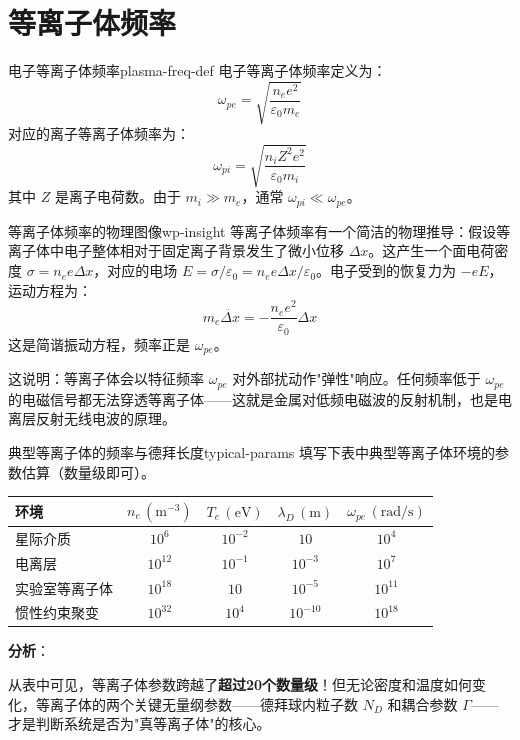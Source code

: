 \documentclass[12pt,a4paper,openany,oneside]{book}
\newcommand{\eps}{\varepsilon}
\newcommand{\difficulty}[1]{\marginnote{\textcolor{red}{\textbf{[#1]}}}}
\begin{document}
\section{等离子体频率}\difficulty{基础}

\begin{definition}{电子等离子体频率}{plasma-freq-def}
电子等离子体频率定义为：
\[
\omega_{pe} = \sqrt{\frac{n_e e^2}{\eps_0 m_e}}
\]
对应的离子等离子体频率为：
\[
\omega_{pi} = \sqrt{\frac{n_i Z^2 e^2}{\eps_0 m_i}}
\]
其中 $Z$ 是离子电荷数。由于 $m_i \gg m_e$，通常 $\omega_{pi} \ll \omega_{pe}$。
\end{definition}

\begin{insight}{等离子体频率的物理图像}{wp-insight}
等离子体频率有一个简洁的物理推导：假设等离子体中电子整体相对于固定离子背景发生了微小位移 $\Delta x$。这产生一个面电荷密度 $\sigma = n_e e \Delta x$，对应的电场 $E = \sigma/\eps_0 = n_e e \Delta x/\eps_0$。电子受到的恢复力为 $-eE$，运动方程为：
\[
m_e \ddot{\Delta x} = -\frac{n_e e^2}{\eps_0}\Delta x
\]
这是简谐振动方程，频率正是 $\omega_{pe}$。

这说明：等离子体会以特征频率 $\omega_{pe}$ 对外部扰动作"弹性"响应。任何频率低于 $\omega_{pe}$ 的电磁信号都无法穿透等离子体——这就是金属对低频电磁波的反射机制，也是电离层反射无线电波的原理。
\end{insight}

\begin{example}{典型等离子体的频率与德拜长度}{typical-params}
\difficulty{基础}
填写下表中典型等离子体环境的参数估算（数量级即可）。
\begin{center}
\begin{tabular}{lcccc}
\toprule
\textbf{环境} & $n_e\,(\mathrm{m}^{-3})$ & $T_e\,(\mathrm{eV})$ & $\lambda_D\,(\mathrm{m})$ & $\omega_{pe}\,(\mathrm{rad/s})$ \\
\midrule
星际介质 & $10^6$ & $10^{-2}$ & $10$ & $10^4$ \\
电离层 & $10^{12}$ & $10^{-1}$ & $10^{-3}$ & $10^7$ \\
实验室等离子体 & $10^{18}$ & $10$ & $10^{-5}$ & $10^{11}$ \\
惯性约束聚变 & $10^{32}$ & $10^4$ & $10^{-10}$ & $10^{18}$ \\
\bottomrule
\end{tabular}
\end{center}
\tcblower
\textbf{分析}：

从表中可见，等离子体参数跨越了\textbf{超过20个数量级}！但无论密度和温度如何变化，等离子体的两个关键无量纲参数——德拜球内粒子数 $N_D$ 和耦合参数 $\Gamma$——才是判断系统是否为"真等离子体"的核心。
\end{example}
\end{document}
